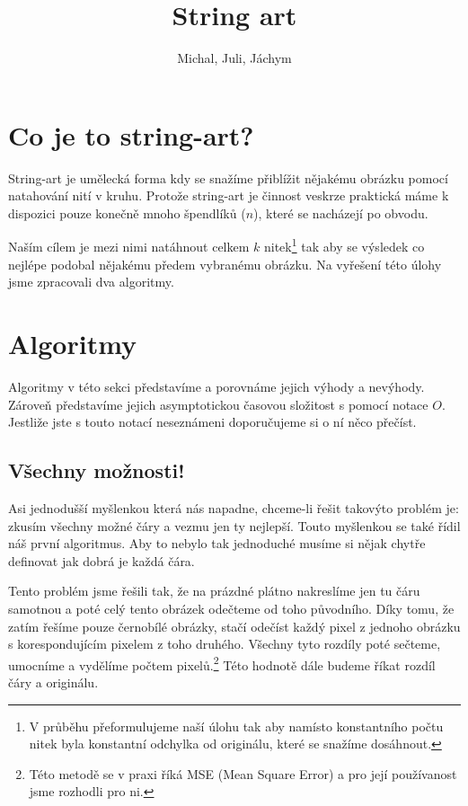\documentclass{article}
\author{Michal, Juli, Jáchym}
\title{String art}
\begin{document}
\maketitle

\section{Co je to string-art?}
\label{sec:string-art}
String-art je umělecká forma kdy se snažíme přiblížit nějakému obrázku pomocí
natahování nití v kruhu. Protože string-art je činnost veskrze praktická máme k
dispozici pouze konečně mnoho špendlíků ($n$), které se nacházejí po obvodu.

Naším cílem je mezi nimi natáhnout celkem $k$ nitek\footnote{V průběhu
	přeformulujeme naší úlohu tak aby namísto konstantního počtu nitek byla konstantní
	odchylka od originálu, které se snažíme dosáhnout.} tak aby se výsledek co
nejlépe podobal nějakému předem vybranému obrázku. Na vyřešení této úlohy jsme
zpracovali dva algoritmy.


\section{Algoritmy}
\label{sec:algoritmy}
Algoritmy v této sekci představíme a porovnáme jejich výhody a nevýhody. Zároveň
představíme jejich asymptotickou časovou složitost s pomocí notace $O$. Jestliže
jste s touto notací neseznámeni doporučujeme si o ní něco přečíst.

\subsection{Všechny možnosti!}
\label{ssec:vsechny-moznosti}
Asi jednodušší myšlenkou která nás napadne, chceme-li řešit takovýto problém je:
zkusím všechny možné čáry a vezmu jen ty nejlepší. Touto myšlenkou se také řídil
náš první algoritmus. Aby to nebylo tak jednoduché musíme si nějak chytře
definovat jak dobrá je každá čára.

Tento problém jsme řešili tak, že na prázdné plátno nakreslíme jen tu čáru
samotnou a poté celý tento obrázek odečteme od toho původního. Díky tomu, že zatím řešíme
pouze černobílé obrázky, stačí odečíst každý pixel z jednoho obrázku s
korespondujícím pixelem z toho druhého. Všechny tyto rozdíly poté sečteme,
umocníme a vydělíme počtem pixelů.\footnote{Této metodě se v praxi říká MSE
 (Mean Square Error) a pro její používanost jsme rozhodli pro ni.} Této hodnotě
dále budeme říkat rozdíl čáry a originálu.
\end{document}

